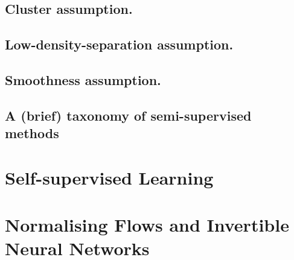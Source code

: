 \cite{chapelle2009semi, scholkopf2021toward}

\subsection{Cluster assumption.}\label{ssec:cluster_assumption}
%
\subsection{Low-density-separation assumption.}\label{ssec:lds_assumption}
%
\subsection{Smoothness assumption.}\label{ssec:smoothness_assumption}

\subsection{A (brief) taxonomy of semi-supervised methods}

\section{ Self-supervised Learning }\label{sec:SelfSL}

\section{ Normalising Flows and Invertible Neural Networks }\label{sec:nfs_and_inns}
